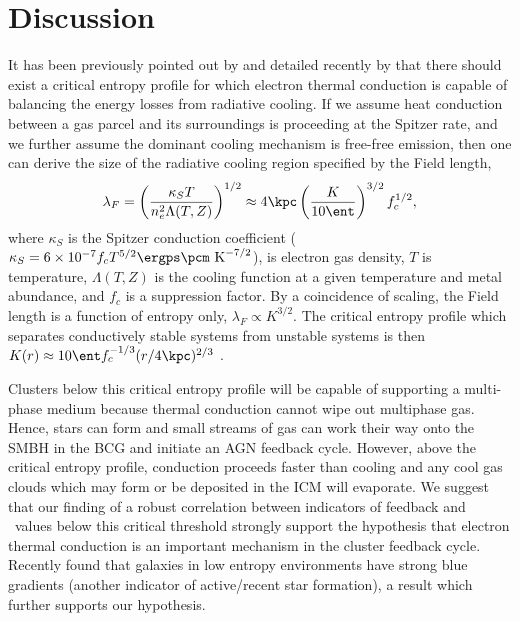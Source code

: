 \documentclass{emulateapj}
\begin{document}

\section{Discussion}
\label{sec:diss}

It has been previously pointed out by \cite{2005ApJ...630L..13D} and
detailed recently by \cite{conduction} that there should exist a
critical entropy profile for which electron thermal conduction is
capable of balancing the energy losses from radiative cooling. If we
assume heat conduction between a gas parcel and its surroundings is
proceeding at the Spitzer rate, and we further assume the dominant
cooling mechanism is free-free emission, then one can derive the
size of the radiative cooling region specified by the Field length,
\begin{equation}
\lambda_F = \left(\frac{\kappa_S T}{n_e^2 \Lambda(T,Z)}\right)^{1/2} \approx 4 \kpc \left(\frac{K}{10 \ent}\right)^{3/2}f_c^{1/2}, \nonumber
\end{equation}
where $\kappa_S$ is the Spitzer conduction coefficient ($\kappa_S =
6\times10^{-7} f_c T^{5/2} \ergps \pcm \mathrm{~K}^{-7/2}$), \nelec
is electron gas density, $T$ is temperature, $\Lambda(T,Z)$ is the
cooling function at a given temperature and metal abundance, and $f_c$
is a suppression factor. By a coincidence of scaling, the Field length
is a function of entropy only, $\lambda_F \propto K^{3/2}$. The
critical entropy profile which separates conductively stable systems
from unstable systems is then $K(r) \approx 10 \ent f_c^{-1/3}
(r/4\kpc)^{2/3}$ \citep{2005ApJ...630L..13D}.

Clusters below this critical entropy profile will be capable of
supporting a multi-phase medium because thermal conduction cannot wipe
out multiphase gas. Hence, stars can form and small streams of
gas can work their way onto the SMBH in the BCG and initiate
an AGN feedback cycle. However, above the critical entropy profile,
conduction proceeds faster than cooling and any cool gas clouds which
may form or be deposited in the ICM will evaporate. We suggest that
our finding of a robust correlation between indicators of feedback and
\kna\ values below this critical threshold strongly support the
hypothesis that electron thermal conduction is an important mechanism
in the cluster feedback cycle. Recently \cite{2008arXiv0802.1864R}
found that galaxies in low entropy environments have strong blue
gradients (another indicator of active/recent star formation), a
result which further supports our hypothesis.
\end{document}
